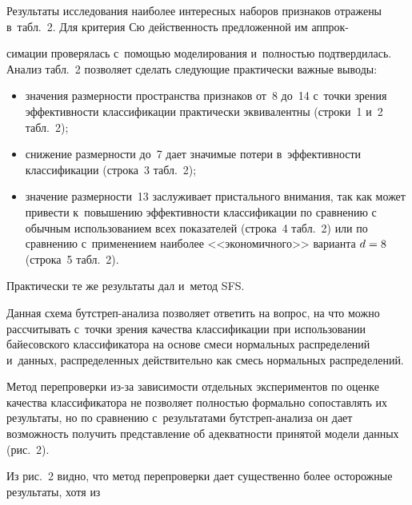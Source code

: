 \begin{multicols}{2}
     Результаты исследования наиболее интересных наборов признаков 
отражены в~табл.~2. Для критерия Сю действенность предложенной им 
аппрок-\linebreak\vspace*{-12pt}

\columnbreak

\noindent
симации проверялась с~помощью моделирования и~полностью 
подтвердилась. Анализ табл.~2 поз\-во\-ляет сделать следующие практически 
важные выводы:
     \begin{itemize}
\item значения размерности пространства признаков от~8 до~14 с~точки 
зрения эффективности классификации практически эквивалентны (строки~1 
и~2 табл.~2);
\item снижение размерности до~7 дает значимые потери в~эффективности 
классификации (строка~3 табл.~2);
\item значение размерности~13 заслуживает пристального внимания, так как 
может привести к~повышению эффективности классификации по сравнению 
с обычным использованием всех показателей (строка~4 табл.~2) или по 
сравнению с~применением наиболее <<экономичного>> варианта $d\hm=8$ 
(строка~5 табл.~2).
\end{itemize}

     Практически те же результаты дал и~метод SFS.
     
     Данная схема бутстреп-ана\-ли\-за позволяет ответить на вопрос, на что 
можно рассчитывать с~точки зрения качества классификации при 
использовании байесовского классификатора на основе смеси нормальных 
распределений и~данных, распределенных действительно как смесь 
нормальных распределений. 
     
     Метод перепроверки из-за зависимости от\-дельных экспериментов по 
оценке качества клас\-сификатора не позволяет полностью формально 
сопоставлять их результаты, но по сравнению с~результатами  
бут\-стреп-ана\-ли\-за он дает возможность получить представление об 
адекватности принятой модели данных (рис.~2). 

     Из рис.~2 видно, что метод перепроверки дает существенно более 
осторожные результаты, хотя из\linebreak\vspace*{-12pt}


\vspace*{12pt}

\noindent
 \begin{center}  %
 \vspace*{-6pt}
\mbox{%
 \epsfxsize=77.995mm
 }
\end{center} 



\end{multicols}

